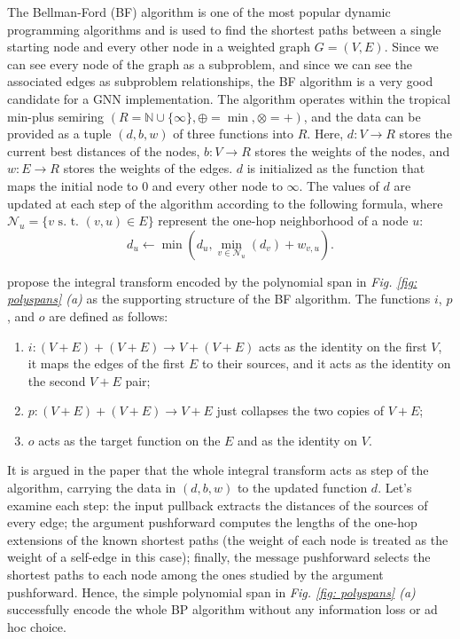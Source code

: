 \documentclass[11pt,a4paper,openright,twoside]{report}
\theoremstyle{plain}
\theoremstyle{definition}
\begin{document}
The Bellman-Ford (BF) algorithm is one of the most popular dynamic programming algorithms and is used to find the shortest paths between a single starting node and every other node in a weighted graph $G = (V, E)$. Since we can see every node of the graph as a subproblem, and since we can see the associated edges as subproblem relationships, the BF algorithm is a very good candidate for a GNN implementation. The algorithm operates within the tropical min-plus semiring $(R = \mathbb{N} \cup \{\infty\}, \oplus = \min, \otimes = +)$, and the data can be provided as a tuple $(d, b, w)$ of three functions into $R$. Here, $d: V \to R$ stores the current best distances of the nodes, $b: V \to R$ stores the weights of the nodes, and $w: E \to R$ stores the weights of the edges. $d$ is initialized as the function that maps the initial node to $0$ and every other node to $\infty$. The values of $d$ are updated at each step of the algorithm according to the following formula, where $\mathcal{N}_u = \{v \text{ s. t. } (v,u) \in E\}$ represent the one-hop neighborhood of a node $u$:
\[d_u \longleftarrow  \min\left(d_u, \min_{v \in \mathcal{N}_u}(d_v) + w_{v,u}\right).\]

\cite{dudzik2022graph} propose the integral transform encoded by the polynomial span in \textit{Fig. \ref{fig: polyspans} (a)} as the supporting structure of the BF algorithm. The functions $i$, $p$, and $o$ are defined as follows:
\begin{enumerate}
  \item $i: (V + E) + (V + E) \to V + (V + E)$ acts as the identity on the first $V$, it maps the edges of the first $E$ to their sources, and it acts as the identity on the second $V + E$ pair;
  \item $p: (V + E) + (V + E) \to V + E$ just collapses the two copies of $V + E$;
  \item $o$ acts as the target function on the $E$ and as the identity on $V$.
\end{enumerate}
It is argued in the paper that the whole integral transform acts as step of the algorithm, carrying the data in $(d, b, w)$ to the updated function $d$. Let's examine each step: the input pullback extracts the distances of the sources of every edge; the argument pushforward computes the lengths of the one-hop extensions of the known shortest paths (the weight of each node is treated as the weight of a self-edge in this case); finally, the message pushforward selects the shortest paths to each node among the ones studied by the argument pushforward. 
Hence, the simple polynomial span in \textit{Fig. \ref{fig: polyspans} (a)} successfully encode the whole BP algorithm without any information loss or ad hoc choice. 
\end{document}

